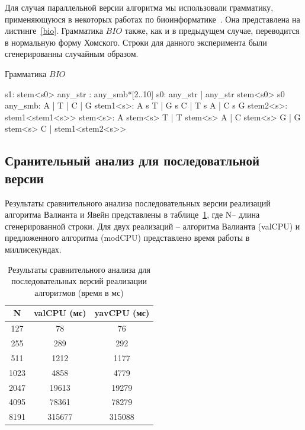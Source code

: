 \documentclass[14pt]{matmex-diploma-custom}
\begin{document}
Для случая параллельной версии алгоритма мы использовали грамматику, применяющуюся в некоторых работах по биоинформатике~\cite{bioinformatics19}. Она представлена на листинге~\ref{bio}. Грамматика $BIO$ также, как и в предыдущем случае, переводится в нормальную форму Хомского. Строки для данного эксперимента были сгенерированны случайным образом.

\begin{listing}[h]
\caption{Грамматика $BIO$}
\begin{pyglist}[]
            s1: stem<s0>
            any_str : any_smb*[2..10]
            s0: any_str | any_str stem<s0> s0
            any_smb: A | T | C | G
            stem1<s>: A s T | G s C | T s A | C s G 
            stem2<s>: stem1<stem1<s>>
            stem<s>:  
                  A stem<s> T 
                | T stem<s> A 
                | C stem<s> G 
                | G stem<s> C 
                | stem1<stem2<s>>  
\end{pyglist}
\label{bio}
\end{listing}



\subsection{Сранительный анализ для последоватльной версии}

Результаты сравнительного анализа последовательных версии реализаций алгоритма Валианта и Явейн представлены в таблице~\ref{tbl1}, где N– длина сгенерированной строки. Для двух реализаций – алгоритма Валианта (valCPU) и предложенного алгоритма (modCPU) представлено время работы в миллисекундах.

\begin{table}[h]
\centering
\caption{Результаты сравнительного анализа для последовательных версий реализации алгоритмов (время в мс)}
\label{tbl1}

    \begin{center}
        \begin{tabular}{ |c|c|c| } 
        \hline
        N & valCPU (мс) &  yavCPU (мс)\\
        \hline
        \hline
         127 & 78 & 76 \\ 
         255 & 289 & 292 \\ 
         511 & 1212 & 1177 \\ 
         1023 & 4858 & 4779 \\
         2047 & 19613 & 19279 \\
         4095 & 78361 & 78279 \\
         8191 & 315677 & 315088 \\
         \hline
        \end{tabular}
    \end{center}

\end{table}
\end{document}
